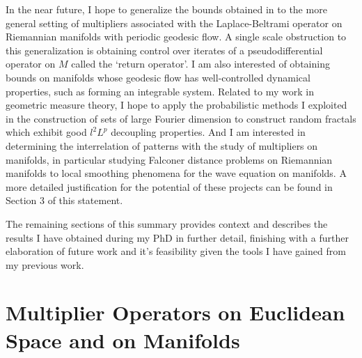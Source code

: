 \documentclass[11pt]{article}
\DeclareMathOperator{\RR}{\mathbb{R}}
\begin{document}

In the near future, I hope to generalize the bounds obtained in \cite{DensonCharacterization} to the more general setting of multipliers associated with the Laplace-Beltrami operator on Riemannian manifolds with periodic geodesic flow. A single scale obstruction to this generalization is obtaining control over iterates of a pseudodifferential operator on $M$ called the `return operator'.
I am also interested of obtaining bounds on manifolds whose geodesic flow has well-controlled dynamical properties, such as forming an integrable system. Related to my work in geometric measure theory, I hope to apply the probabilistic methods I exploited in the construction of sets of large Fourier dimension to construct random fractals which exhibit good $l^2L^p$ decoupling properties. And I am interested in determining the interrelation of patterns with the study of multipliers on manifolds, in particular studying Falconer distance problems on Riemannian manifolds to local smoothing phenomena for the wave equation on manifolds. A more detailed justification for the potential of these projects can be found in Section 3 of this statement.

The remaining sections of this summary provides context and describes the results I have obtained during my PhD in further detail, finishing with a further elaboration of future work and it's feasibility given the tools I have gained from my previous work.

\pagebreak[3]

\section{Multiplier Operators on Euclidean Space and on Manifolds} \label{Section1}
\end{document}
